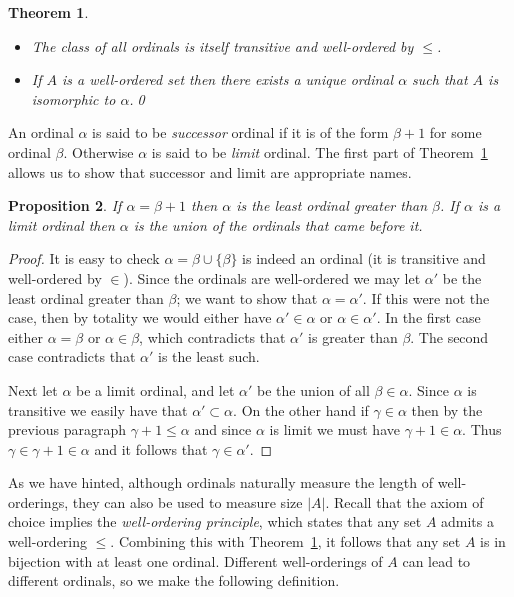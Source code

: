\documentclass[11pt,oneside]{amsbook}
\theoremstyle{definition}
\theoremstyle{plain}
\newtheorem{thm}{Theorem}[section]
\newtheorem{prop}[thm]{Proposition}
\theoremstyle{definition}
\theoremstyle{remark}
\numberwithin{equation}{section}
\numberwithin{figure}{section}
\begin{document}
\begin{thm}\
  \label{thm:ordinals}
  \begin{itemize}
  \item The class of all ordinals is itself transitive and well-ordered by $\leq$.
  \item If $A$ is a well-ordered set then there exists a unique ordinal $\alpha$ such that $A$ is isomorphic to $\alpha$.\qed
  \end{itemize}
\end{thm}

An ordinal $\alpha$ is said to be \emph{successor} ordinal if it is of the form $\beta+1$ for some ordinal $\beta$. Otherwise $\alpha$ is said to be \emph{limit} ordinal. The first part of Theorem~\ref{thm:ordinals} allows us to show that successor and limit are appropriate names.

\begin{prop}
  If $\alpha=\beta+1$ then $\alpha$ is the least ordinal greater than $\beta$. If $\alpha$ is a limit ordinal then $\alpha$ is the union of the ordinals that came before it.
\end{prop}

\begin{proof}
  It is easy to check $\alpha=\beta\cup\{\beta\}$ is indeed an ordinal (it is transitive and well-ordered by $\in$). Since the ordinals are well-ordered we may let $\alpha'$ be the least ordinal greater than $\beta$; we want to show that $\alpha=\alpha'$. If this were not the case, then by totality we would either have $\alpha'\in\alpha$ or $\alpha\in\alpha'$. In the first case either $\alpha=\beta$ or $\alpha\in\beta$, which contradicts that $\alpha'$ is greater than $\beta$. The second case contradicts that $\alpha'$ is the least such.

  Next let $\alpha$ be a limit ordinal, and let $\alpha'$ be the union of all $\beta\in\alpha$. Since $\alpha$ is transitive we easily have that $\alpha'\subset\alpha$. On the other hand if $\gamma\in\alpha$ then by the previous paragraph $\gamma+1\leq\alpha$ and since $\alpha$ is limit we must have $\gamma+1\in\alpha$. Thus $\gamma\in\gamma+1\in\alpha$ and it follows that $\gamma\in\alpha'$.
\end{proof}

As we have hinted, although ordinals naturally measure the length of well-orderings, they can also be used to measure size $|A|$. Recall that the axiom of choice implies the \emph{well-ordering principle}, which states that any set $A$ admits a well-ordering $\leq$. Combining this with Theorem~\ref{thm:ordinals}, it follows that any set $A$ is in bijection with at least one ordinal. Different well-orderings of $A$ can lead to different ordinals, so we make the following definition.
\end{document}
